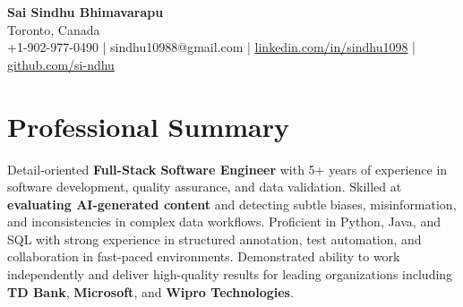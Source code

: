 \documentclass[letterpaper,11pt]{article}
\begin{document}
\begin{center}
  {\Large \textbf{Sai Sindhu Bhimavarapu}} \\
  Toronto, Canada \\
  +1-902-977-0490 \enspace | \enspace sindhu10988@gmail.com \enspace | \enspace \href{https://www.linkedin.com/in/sindhu1098/}{linkedin.com/in/sindhu1098} \enspace | \enspace \href{https://github.com/si-ndhu}{github.com/si-ndhu}
\end{center}

\section{Professional Summary}
  \begin{itemize}[leftmargin=0.15in, label={}]
    \small{\item{
     Detail-oriented \textbf{Full-Stack Software Engineer} with 5+ years of experience in software development, quality assurance, and data validation. Skilled at \textbf{evaluating AI-generated content} and detecting subtle biases, misinformation, and inconsistencies in complex data workflows. Proficient in Python, Java, and SQL with strong experience in structured annotation, test automation, and collaboration in fast-paced environments. Demonstrated ability to work independently and deliver high-quality results for leading organizations including \textbf{TD Bank}, \textbf{Microsoft}, and \textbf{Wipro Technologies}.
    }}
  \end{itemize}
\vspace{-16pt}

\end{document}

